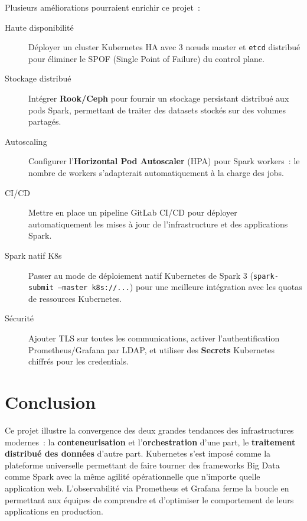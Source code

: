 \documentclass[12pt,a4paper,french]{report}
\newcommand{\cmd}[1]{\texttt{\small\color{keywordcolor}#1}}
\newcommand{\kw}[1]{\textbf{#1}}
\begin{document}
Plusieurs améliorations pourraient enrichir ce projet~:

\begin{description}
  \item[Haute disponibilité] Déployer un cluster Kubernetes HA avec 3 nœuds master et \cmd{etcd} distribué pour éliminer le SPOF (Single Point of Failure) du control plane.
  
  \item[Stockage distribué] Intégrer \kw{Rook/Ceph} pour fournir un stockage persistant distribué aux pods Spark, permettant de traiter des datasets stockés sur des volumes partagés.
  
  \item[Autoscaling] Configurer l'\kw{Horizontal Pod Autoscaler} (HPA) pour Spark workers~: le nombre de workers s'adapterait automatiquement à la charge des jobs.
  
  \item[CI/CD] Mettre en place un pipeline GitLab CI/CD pour déployer automatiquement les mises à jour de l'infrastructure et des applications Spark.
  
  \item[Spark natif K8s] Passer au mode de déploiement natif Kubernetes de Spark 3 (\cmd{spark-submit --master k8s://...}) pour une meilleure intégration avec les quotas de ressources Kubernetes.
  
  \item[Sécurité] Ajouter TLS sur toutes les communications, activer l'authentification Prometheus/Grafana par LDAP, et utiliser des \kw{Secrets} Kubernetes chiffrés pour les credentials.
\end{description}

\section{Conclusion}

Ce projet illustre la convergence des deux grandes tendances des infrastructures modernes~: la \kw{conteneurisation} et l'\kw{orchestration} d'une part, le \kw{traitement distribué des données} d'autre part. Kubernetes s'est imposé comme la plateforme universelle permettant de faire tourner des frameworks Big Data comme Spark avec la même agilité opérationnelle que n'importe quelle application web. L'observabilité via Prometheus et Grafana ferme la boucle en permettant aux équipes de comprendre et d'optimiser le comportement de leurs applications en production.

\end{document}
